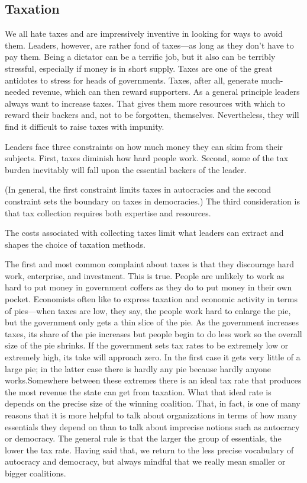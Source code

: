 \documentclass[10pt]{article}
\begin{document}
\subsection{Taxation}

{\large We all hate taxes and are impressively inventive in looking for ways to
avoid them. Leaders, however, are rather fond of taxes---as long as they don't
have to pay them. Being a dictator can be a terrific job, but it also can be
terribly stressful, especially if money is in short supply. Taxes are one of the
great antidotes to stress for heads of governments. Taxes, after all, generate
much-needed revenue, which can then reward supporters. As a general principle
leaders always want to increase taxes. That gives them more resources with which
to reward their backers and, not to be forgotten, themselves. Nevertheless, they
will find it difficult to raise taxes with impunity.}

{\large Leaders face three constraints on how much money they can skim from
their subjects. First, taxes diminish how hard people work. Second, some of the
tax burden inevitably will fall upon the essential backers of the leader.}

{\large (In general, the first constraint limits taxes in autocracies and the
second constraint sets the boundary on taxes in democracies.) The third
consideration is that tax collection requires both expertise and resources.}

{\large The costs associated with collecting taxes limit what leaders can
extract and shapes the choice of taxation methods.}

{\large The first and most common complaint about taxes is that they discourage
hard work, enterprise, and investment. This is true. People are unlikely to work
as hard to put money in government coffers as they do to put money in their own
pocket. Economists often like to express taxation and economic activity in terms
of pies---when taxes are low, they say, the people work hard to enlarge the pie,
but the government only gets a thin slice of the pie. As the government increases
taxes, its share of the pie increases but people begin to do less work so the
overall size of the pie shrinks. If the government sets tax rates to be extremely
low or extremely high, its take will approach zero. In the first case it gets
very little of a large pie; in the latter case there is hardly any pie because
hardly anyone works.Somewhere between these extremes there is an ideal tax rate
that produces the most revenue the state can get from taxation. What that ideal
rate is depends on the precise size of the winning coalition. That, in fact, is
one of many reasons that it is more helpful to talk about organizations in terms
of how many essentials they depend on than to talk about imprecise notions such
as autocracy or democracy. The general rule is that the larger the group of
essentials, the lower the tax rate. Having said that, we return to the less
precise vocabulary of autocracy and democracy, but always mindful that we really
mean smaller or bigger coalitions.}
\end{document}
